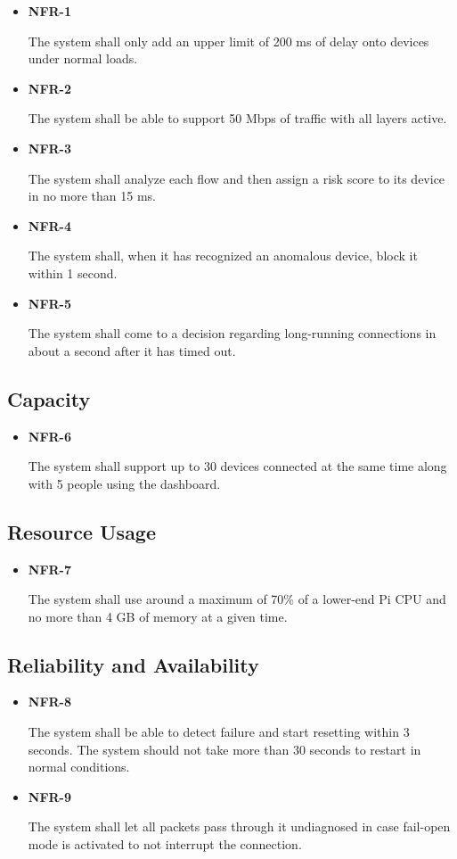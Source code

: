 \begin{itemize}
\item \hypertarget{req:NFR-1}{\textbf{NFR-1}} The system shall only add an upper limit of 200 ms of delay onto devices under normal loads.
\item \hypertarget{req:NFR-2}{\textbf{NFR-2}} The system shall be able to support 50 Mbps of traffic with all layers active.
\item \hypertarget{req:NFR-3}{\textbf{NFR-3}} The system shall analyze each flow and then assign a risk score to its device in no more than 15 ms.
\item \hypertarget{req:NFR-4}{\textbf{NFR-4}} The system shall, when it has recognized an anomalous device, block it within 1 second.
\item \hypertarget{req:NFR-5}{\textbf{NFR-5}} The system shall come to a decision regarding long-running connections in about a second after it has timed out.
\end{itemize}

\subsection{Capacity}\label{sec:4.4.2}

\begin{itemize}
\item \hypertarget{req:NFR-6}{\textbf{NFR-6}} The system shall support up to 30 devices connected at the same time along with 5 people using the dashboard.
\end{itemize}

\subsection{Resource Usage}\label{sec:4.4.3}

\begin{itemize}
\item \hypertarget{req:NFR-7}{\textbf{NFR-7}} The system shall use around a maximum of 70\% of a lower-end Pi CPU and no more than 4 GB of memory at a given time.
\end{itemize}

\subsection{Reliability and Availability}\label{sec:4.4.4}

\begin{itemize}
\item \hypertarget{req:NFR-8}{\textbf{NFR-8}} The system shall be able to detect failure and start resetting within 3 seconds. The system should not take more than 30 seconds to restart in normal conditions.
\item \hypertarget{req:NFR-9}{\textbf{NFR-9}} The system shall let all packets pass through it undiagnosed in case fail-open mode is activated to not interrupt the connection.
\end{itemize}


